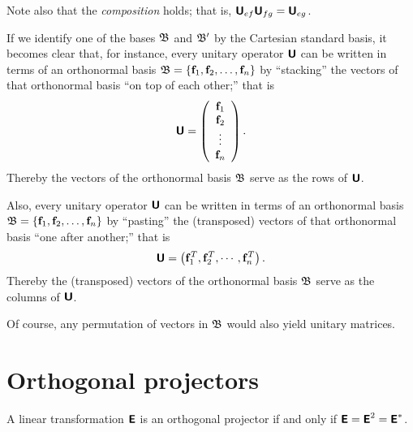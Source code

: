 Note also that the {\em composition} holds; that is, $\textsf{\textbf{U}}_{ef} \textsf{\textbf{U}}_{fg}=  \textsf{\textbf{U}}_{eg}$.



If we
identify one of the bases  ${\frak B}$ and ${\frak B}'$ by the Cartesian standard basis,
it becomes clear that, for instance,
every unitary operator  $\textsf{\textbf{U}}$  can be written in terms of an orthonormal basis
${\frak B}=\{{\bf f}_1,  {\bf f}_2, \ldots , {\bf f}_n\}$
by ``stacking'' the vectors of that orthonormal basis ``on top of each other;''
that is
\begin{equation}
\textsf{\textbf{U}}= \left(
\begin{array}{c}
{\bf f}_1\\
{\bf f}_2\\
\vdots\\
{\bf f}_n
\end{array}
\right).
\end{equation}
Thereby the vectors of the orthonormal basis  ${\frak B}$ serve as the
rows of $\textsf{\textbf{U}}$.

Also, every unitary operator  $\textsf{\textbf{U}}$  can be written in terms of an orthonormal basis
${\frak B}=\{{\bf f}_1,  {\bf f}_2, \ldots , {\bf f}_n\}$
by ``pasting'' the (transposed) vectors of that orthonormal basis ``one after another;''
that is
\begin{equation}
\textsf{\textbf{U}}= \left(
{\bf f}_1^T,
{\bf f}_2^T,
\cdots,
{\bf f}_n^T
\right).
\end{equation}
Thereby the (transposed) vectors of the orthonormal basis  ${\frak B}$ serve as the
columns of $\textsf{\textbf{U}}$.

Of course, any permutation of vectors in ${\frak B}$ would also yield unitary matrices.







\section{Orthogonal projectors}

A linear transformation $\textsf{\textbf{E}}$ is an orthogonal projector
if and only if $\textsf{\textbf{E}} = \textsf{\textbf{E}}^2=\textsf{\textbf{E}}^*$.

